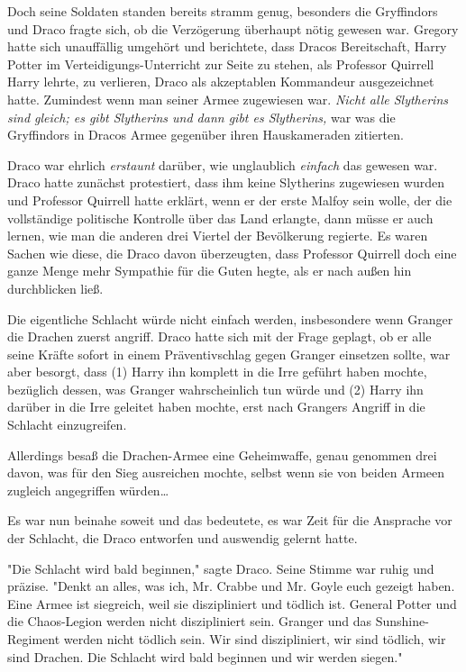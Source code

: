 {Doch seine Soldaten standen bereits stramm genug, besonders die Gryffindors und Draco fragte sich, ob die Verzögerung überhaupt nötig gewesen war. Gregory hatte sich unauffällig umgehört und berichtete, dass Dracos Bereitschaft, Harry Potter im Verteidigungs-Unterricht zur Seite zu stehen, als Professor Quirrell Harry lehrte, zu verlieren, Draco als akzeptablen Kommandeur ausgezeichnet hatte. Zumindest wenn man seiner Armee zugewiesen war. \emph{Nicht alle Slytherins sind gleich; es gibt Slytherins und dann gibt es Slytherins,} war was die Gryffindors in Dracos Armee gegenüber ihren Hauskameraden zitierten.

Draco war ehrlich \emph{erstaunt} darüber, wie unglaublich \emph{einfach} das gewesen war. Draco hatte zunächst protestiert, dass ihm keine Slytherins zugewiesen wurden und Professor Quirrell hatte erklärt, wenn er der erste Malfoy sein wolle, der die vollständige politische Kontrolle über das Land erlangte, dann müsse er auch lernen, wie man die anderen drei Viertel der Bevölkerung regierte. Es waren Sachen wie diese, die Draco davon überzeugten, dass Professor Quirrell doch eine ganze Menge mehr Sympathie für die Guten hegte, als er nach außen hin durchblicken ließ.

Die eigentliche Schlacht würde nicht einfach werden, insbesondere wenn Granger die Drachen zuerst angriff. Draco hatte sich mit der Frage geplagt, ob er alle seine Kräfte sofort in einem Präventivschlag gegen Granger einsetzen sollte, war aber besorgt, dass (1) Harry ihn komplett in die Irre geführt haben mochte, bezüglich dessen, was Granger wahrscheinlich tun würde und (2) Harry ihn darüber in die Irre geleitet haben mochte, erst nach Grangers Angriff in die Schlacht einzugreifen.

Allerdings besaß die Drachen-Armee eine Geheimwaffe, genau genommen drei davon, was für den Sieg ausreichen mochte, selbst wenn sie von beiden Armeen zugleich angegriffen würden…

Es war nun beinahe soweit und das bedeutete, es war Zeit für die Ansprache vor der Schlacht, die Draco entworfen und auswendig gelernt hatte.

"Die Schlacht wird bald beginnen," sagte Draco. Seine Stimme war ruhig und präzise. "Denkt an alles, was ich, Mr. Crabbe und Mr. Goyle euch gezeigt haben. Eine Armee ist siegreich, weil sie diszipliniert und tödlich ist. General Potter und die Chaos-Legion werden nicht diszipliniert sein. Granger und das Sunshine-Regiment werden nicht tödlich sein. Wir sind diszipliniert, wir sind tödlich, wir sind Drachen. Die Schlacht wird bald beginnen und wir werden siegen."

}
